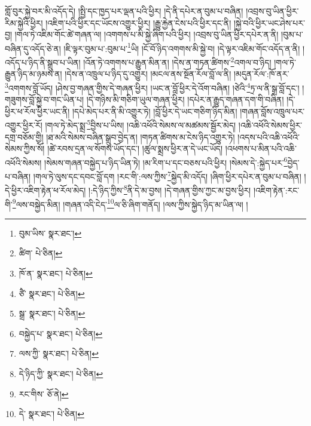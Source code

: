 གློ་བུར་སྐྱེ་བར་མི་འདོད་དེ། །སྤྱི་དང་ཁྱད་པར་ལྡན་པའི་ཕྱིར། །དེ་ནི་དཔེར་ན་བུམ་པ་བཞིན། །འབྲས་བུ་ཡིན་ཕྱིར་རིམ་སྐྱེའི་ཕྱིར། །འཇིག་པའི་ཕྱིར་དང་ཡོངས་འགྱུར་ཕྱིར། །རྒྱུ་རྐྱེན་ངེས་པའི་ཕྱིར་དང་ནི། །སྐྱེ་བའི་ཕྱིར་ཡང་ཤེས་པར་བྱ། །གལ་ཏེ་འཇིམ་གོང་ཚེ་གཞན་ལ། །འགགས་པ་མི་སྐྱེ་ཞིག་པའི་ཕྱིར། །འབྲས་བུ་ཡིན་ཕྱིར་དཔེར་ན་ནི། །བུམ་པ་བཞིན་དུ་འདོད་ཅེ་ན། །ཇི་ལྟར་བུམ་པ་:བུམ་པ་\footnote{བུམ་ཡིས་  སྣར་ཐང་། }ཡི། །ངོ་བོ་ཉིད་འགགས་མི་སྐྱེ་བ། །དེ་ལྟར་འཇིམ་གོང་འདོད་ན་ནི། །འདོད་པ་ཉིད་ནི་སྒྲུབ་པ་ཡིན། །འོན་ཏེ་འགགས་པ་རྒྱུན་མིན་ན། །དེས་ན་གཏན་ཚིགས་\footnote{ཚིག་  པེ་ཅིན། }འགལ་བ་ཉིད། །གལ་ཏེ་རྒྱུན་ཉིད་མ་ཉམས་ན། །དེས་ན་འཁྲུལ་པ་ཉིད་དུ་འགྱུར། །མངལ་ནས་སྔོན་རོལ་བློ་ལ་ནི། །མདུན་རོལ་:ཁོ་ནར་\footnote{ཁོ་ན་  སྣར་ཐང་།  པེ་ཅིན། }འགགས་བློ་ཡོད། །ཤེས་བྱ་གཞན་གྱིས་དེ་གཞན་ཕྱིར། །ཡང་ན་བློ་ཕྱིར་དེ་འོག་བཞིན། །ཙེའི་\footnote{ཙཻ་  སྣར་ཐང་།  པེ་ཅིན། }ཏྲ་ལ་ནི་སྒྲ་བློ་དང་། །གཟུགས་བློ་སྐྱེ་བ་གང་ཡིན་པ། །དེ་གཉིས་མི་གཅིག་ཡུལ་གཞན་ཕྱིར། །དཔེར་ན་རྒྱུད་གཞན་དག་གི་བཞིན། །དེ་ཕྱིར་ཕ་རོལ་ཕྱིར་ཡང་ནི། །དཔེ་མེད་པར་ནི་མི་འགྱུར་ཏེ། །བློ་ཕྱིར་དེ་ཡང་གཅིག་ཉིད་མིན། །གཞན་བློས་འཁྲུལ་པར་འགྱུར་ཕྱིར་རོ། །གལ་ཏེ་མེད་སྨྲ་\footnote{སྒྲ་  སྣར་ཐང་།  པེ་ཅིན། }བྱིས་པ་ཡིས། །འཆི་འཕོའི་སེམས་ལ་མཚམས་སྦྱོར་མེད། །འཆི་འཕོའི་སེམས་ཕྱིར་དགྲ་བཅོམ་གྱི། །ཐ་མའི་སེམས་བཞིན་སྒྲུབ་བྱེད་ན། །གཏན་ཚིགས་མ་ངེས་ཉིད་འགྱུར་ཏེ། །འདས་པའི་འཆི་འཕོའི་སེམས་ཀྱིས་སོ། །ཚེ་རབས་དྲན་ལ་སོགས་ཡོད་དང་། །ཚུལ་སྨྲས་ཕྱིར་ན་དེ་ཡང་ཡོད། །འཕགས་པ་མིན་པའི་འཆི་འཕོའི་སེམས། །སེམས་གཞན་བསྐྱེད་པ་ཉིད་ཡིན་ཏེ། །མ་རིག་པ་དང་བཅས་པའི་ཕྱིར། །སེམས་དེ་:སྐྱེད་པར་\footnote{བསྐྱེད་པ་  སྣར་ཐང་།  པེ་ཅིན། }བྱེད་པ་བཞིན། །གལ་ཏེ་ལུས་དང་དབང་བློ་དག །རང་གི་:ལས་ཀྱིས་\footnote{ལས་ཀྱི་  སྣར་ཐང་།  པེ་ཅིན། }སྐྱེད་མི་འདོད། །ཞིག་ཕྱིར་དཔེར་ན་བུམ་པ་བཞིན། །དེ་ཕྱིར་འཇིག་རྟེན་ཕ་རོལ་མེད། །:དེ་ཉིད་ཀྱིས་\footnote{དེ་ཉིད་ཀྱི་  སྣར་ཐང་།  པེ་ཅིན། }ནི་དེ་མ་བྱས། །དེ་གཞན་གྱིས་ཀྱང་མ་བྱས་ཕྱིར། །འཇིག་རྟེན་:རང་གི་\footnote{རང་གིས་  ཅོ་ནེ། }ལས་བསྐྱེད་མིན། །གཞན་འདི་ངེད་\footnote{དེ་  སྣར་ཐང་།  པེ་ཅིན། }ལ་ཅི་ཞིག་གནོད། །ལས་ཀྱིས་སྐྱེད་ཉིད་མ་ཡིན་ལ། །
